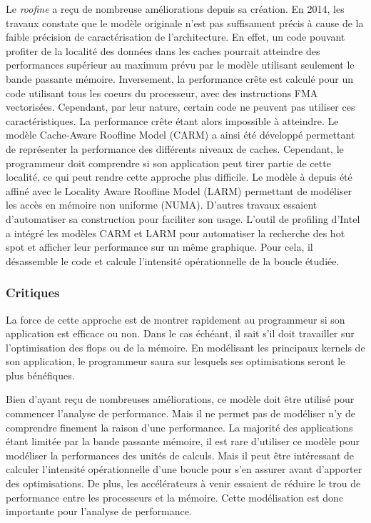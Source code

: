 Le \textit{roofine} a reçu de nombreuse améliorations depuis sa création. En 2014, les travaux \cite{Ilic2014} constate que le modèle originale n’est pas suffisament précis à cause de la faible précision de caractérisation de l’architecture. En effet, un code pouvant profiter de la localité des données dans les caches pourrait atteindre des performances supérieur au maximum prévu par le modèle utilisant seulement le bande passante mémoire. Inversement, la performance crête est calculé pour un code utilisant tous les coeurs du processeur, avec des instructions FMA vectorisées. Cependant, par leur nature, certain code ne peuvent pas utiliser ces  caractéristiques. La performance crête étant alors impossible à atteindre. Le modèle Cache-Aware Roofline Model (CARM) \cite{Ilic2014} a ainsi été développé permettant de représenter la performance des différents niveaux de caches. Cependant, le programmeur doit comprendre si son application peut tirer partie de cette localité, ce qui peut rendre cette approche plus difficile. Le modèle à depuis été affiné avec le Locality Aware Roofline Model (LARM) \cite{Denoyelle2018} permettant de modéliser les accès en mémoire non uniforme (NUMA).
D’autres travaux essaient d’automatiser sa construction \cite{lo2014roofline} pour faciliter son usage. L’outil de profiling d’Intel a intégré les modèles CARM et LARM pour automatiser la recherche des hot spot et afficher leur performance sur un même graphique. Pour cela, il désassemble le code et calcule l’intensité opérationnelle de la boucle étudiée.


\subsubsection{Critiques}

La force de cette approche est de montrer rapidement au programmeur si son application est efficace ou non. Dans le cas échéant, il sait s’il doit travailler sur l’optimisation des flops ou de la mémoire. En modélisant les principaux kernels de son application, le programmeur saura sur lesquels ses optimisations seront le plus bénéfiques.

Bien d’ayant reçu de nombreuses améliorations, ce modèle doit être utilisé pour commencer l’analyse de performance. Mais il ne permet pas de modéliser n’y de comprendre finement la raison d’une performance.
La majorité des applications étant limitée par la bande passante mémoire, il est rare d’utiliser ce modèle pour modéliser la performances des unités de calculs. Mais il peut être intéressant de calculer l’intensité opérationnelle d’une boucle pour s’en assurer avant d’apporter des optimisations. De plus, les accélérateurs à venir essaient de réduire le trou de performance entre les processeurs et la mémoire. Cette modélisation est donc importante pour l’analyse de performance.


%
